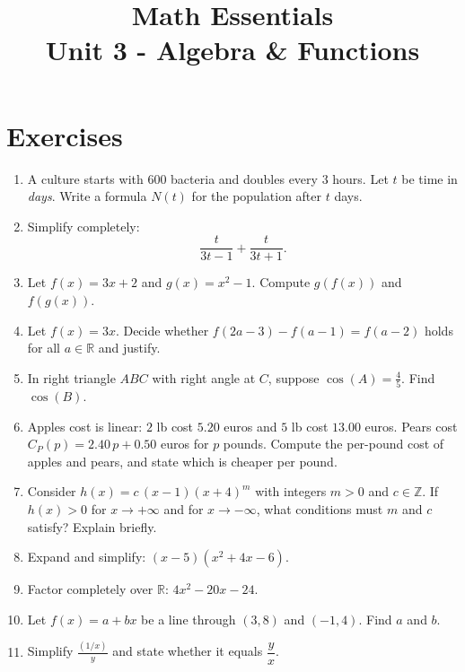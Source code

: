 \documentclass{article}
\title{Math Essentials \\ Unit 3 - Algebra \& Functions}
\author{}
\date{}
\begin{document}
\maketitle

\section*{Exercises}

\begin{enumerate}[label=\textbf{\arabic*.}, leftmargin=*, itemsep=0.6em]

\item A culture starts with $600$ bacteria and doubles every $3$ hours. Let $t$ be time in \emph{days}. Write a formula $N(t)$ for the population after $t$ days.

\item Simplify completely:
\[
\frac{t}{3t-1}+\frac{t}{3t+1}.
\]

\item Let $f(x)=3x+2$ and $g(x)=x^2-1$. Compute $g(f(x))$ and $f(g(x))$.

\item Let $f(x)=3x$. Decide whether $f(2a-3)-f(a-1)=f(a-2)$ holds for all $a\in\mathbb{R}$ and justify.

\item In right triangle $ABC$ with right angle at $C$, suppose $\cos(A)=\frac{4}{5}$. Find $\cos(B)$.

\item Apples cost is linear: $2$ lb cost $5.20$ euros and $5$ lb cost $13.00$ euros. Pears cost $C_P(p)=2.40\,p+0.50$ euros for $p$ pounds. Compute the per-pound cost of apples and pears, and state which is cheaper per pound.

\item Consider $h(x)=c\,(x-1)(x+4)^m$ with integers $m>0$ and $c\in\mathbb{Z}$. If $h(x)>0$ for $x\to+\infty$ and for $x\to-\infty$, what conditions must $m$ and $c$ satisfy? Explain briefly.

\item Expand and simplify: $(x-5)(x^2+4x-6)$.

\item Factor completely over $\mathbb{R}$: $4x^2-20x-24$.

\item Let $f(x)=a+bx$ be a line through $(3,8)$ and $(-1,4)$. Find $a$ and $b$.

\item Simplify $\displaystyle \frac{(1/x)}{y}$ and state whether it equals $\dfrac{y}{x}$. %


\end{enumerate}
\end{document}
